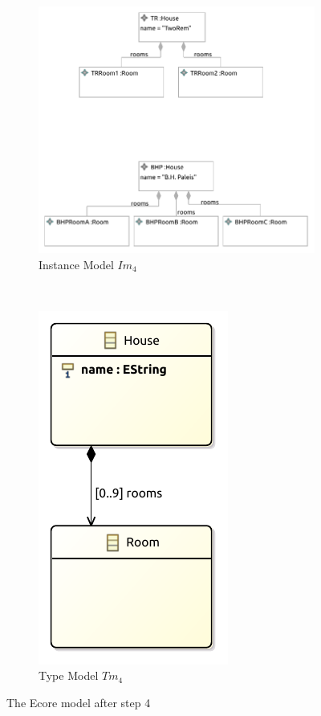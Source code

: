 \begin{figure}[p]
    \centering
    \begin{subfigure}{0.98\textwidth}
        \centering
        \includegraphics{images/06_application/instance_model/step04.pdf}
        \caption{Instance Model $Im_4$}
        \label{fig:application:building_the_model:rooms:ecore:instance_model}
    \end{subfigure}
    \\
    \begin{subfigure}{0.98\textwidth}
        \centering
        \includegraphics{images/06_application/type_model/step04.pdf}
        \caption{Type Model $Tm_4$}
        \label{fig:application:building_the_model:rooms:ecore:type_model}
    \end{subfigure}
    \caption{The Ecore model after step 4}
    \label{fig:application:building_the_model:rooms:ecore}
\end{figure}

